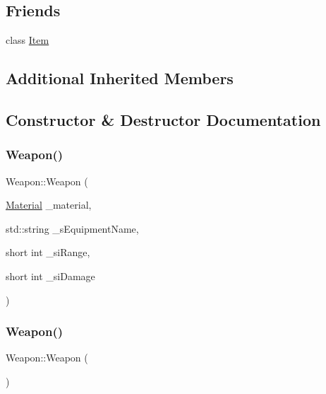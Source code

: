 \subsection*{Friends}
\begin{DoxyCompactItemize}
\item 
class \mbox{\hyperlink{class_weapon_aad85754f188b769ff61150eaf36106c4}{Item}}
\end{DoxyCompactItemize}
\subsection*{Additional Inherited Members}


\subsection{Constructor \& Destructor Documentation}
\mbox{\label{class_weapon_a832f6d4c8d48728aaf1fe0459bed0dbd}} 
\subsubsection{\texorpdfstring{Weapon()}{Weapon()}\hspace{0.1cm}{\footnotesize\ttfamily [1/4]}}
{\footnotesize\ttfamily Weapon\+::\+Weapon (\begin{DoxyParamCaption}\item[{\mbox{\hyperlink{class_material}{Material}}}]{\+\_\+material,  }\item[{std\+::string}]{\+\_\+s\+Equipment\+Name,  }\item[{short int}]{\+\_\+si\+Range,  }\item[{short int}]{\+\_\+si\+Damage }\end{DoxyParamCaption})}

\mbox{\label{class_weapon_a42dbc46dd70319a24763992c4ebbd396}} 
\subsubsection{\texorpdfstring{Weapon()}{Weapon()}\hspace{0.1cm}{\footnotesize\ttfamily [2/4]}}
{\footnotesize\ttfamily Weapon\+::\+Weapon (\begin{DoxyParamCaption}{ }\end{DoxyParamCaption})}

